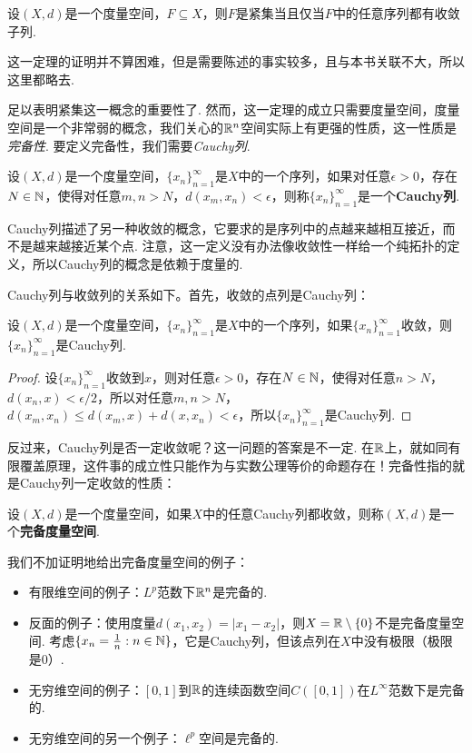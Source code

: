\begin{theorem}\label{thm:compact-converge}
    设$(X,d)$是一个度量空间，$F\subseteq X$，则$F$是紧集当且仅当$F$中的任意序列都有收敛子列. 
\end{theorem}

这一定理的证明并不算困难，但是需要陈述的事实较多，且与本书关联不大，所以这里都略去. 

 足以表明紧集这一概念的重要性了. 然而，这一定理的成立只需要度量空间，度量空间是一个非常弱的概念，我们关心的$\mathbb{R}^n$空间实际上有更强的性质，这一性质是\emph{完备性}. 要定义完备性，我们需要\emph{Cauchy列}. 

\begin{definition}[Cauchy列]
    设$(X,d)$是一个度量空间，$\{x_n\}_{n=1}^\infty$是$X$中的一个序列，如果对任意$\epsilon>0$，存在$N\in\mathbb{N}$，使得对任意$m,n>N$，$d(x_m,x_n)<\epsilon$，则称$\{x_n\}_{n=1}^\infty$是一个\textbf{Cauchy列}. 
\end{definition}

Cauchy列描述了另一种收敛的概念，它要求的是序列中的点越来越相互接近，而不是越来越接近某个点. 注意，这一定义没有办法像收敛性一样给一个纯拓扑的定义，所以Cauchy列的概念是依赖于度量的. 

Cauchy列与收敛列的关系如下。首先，收敛的点列是Cauchy列：

\begin{proposition}\label{prop:cauchy-converge}
    设$(X,d)$是一个度量空间，$\{x_n\}_{n=1}^\infty$是$X$中的一个序列，如果$\{x_n\}_{n=1}^\infty$收敛，则$\{x_n\}_{n=1}^\infty$是Cauchy列. 
\end{proposition}
\begin{proof}
    设$\{x_n\}_{n=1}^\infty$收敛到$x$，则对任意$\epsilon>0$，存在$N\in\mathbb{N}$，使得对任意$n>N$，$d(x_n,x)<\epsilon/2$，所以对任意$m,n>N$，$d(x_m,x_n)\leq d(x_m,x)+d(x,x_n)<\epsilon$，所以$\{x_n\}_{n=1}^\infty$是Cauchy列. 
\end{proof}

反过来，Cauchy列是否一定收敛呢？这一问题的答案是不一定. 在$\mathbb{R}$上，就如同有限覆盖原理，这件事的成立性只能作为与实数公理等价的命题存在！完备性指的就是Cauchy列一定收敛的性质：

\begin{definition}[完备度量空间]
    设$(X,d)$是一个度量空间，如果$X$中的任意Cauchy列都收敛，则称$(X,d)$是一个\textbf{完备度量空间}. 
\end{definition}
我们不加证明地给出完备度量空间的例子：
\begin{example}
\begin{itemize}
\item 有限维空间的例子：$L^p$范数下$\mathbb{R}^n$是完备的.
\item 反面的例子：使用度量$d(x_1,x_2)=|x_1-x_2|$，则$X=\mathbb{R}\setminus\{0\}$不是完备度量空间. 考虑$\{x_n=\frac1n:n\in\mathbb{N}\}$，它是Cauchy列，但该点列在$X$中没有极限（极限是$0$）.
\item 无穷维空间的例子：$[0,1]$到$\mathbb{R}$的连续函数空间$C([0,1])$在$L^\infty$范数下是完备的.
\item 无穷维空间的另一个例子：$\ell^p$空间是完备的. 
\end{itemize}
\end{example}


